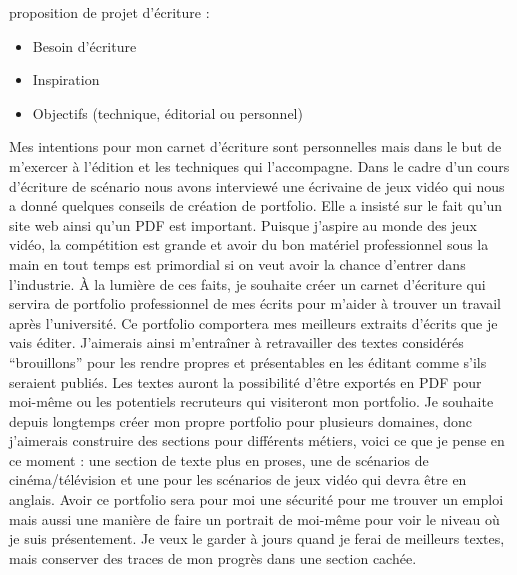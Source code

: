 \documentclass[12pt,french,letterpaper]{article}
\providecommand{\tightlist}{%
  \setlength{\itemsep}{0pt}\setlength{\parskip}{0pt}}
\begin{document}
\normalsize{proposition de projet d'écriture :

\begin{itemize}
\tightlist
\item
  Besoin d'écriture
\item
  Inspiration
\item
  Objectifs (technique, éditorial ou personnel)
\end{itemize}

Mes intentions pour mon carnet d'écriture sont personnelles mais dans le
but de m'exercer à l'édition et les techniques qui l'accompagne. Dans le
cadre d'un cours d'écriture de scénario nous avons interviewé une
écrivaine de jeux vidéo qui nous a donné quelques conseils de création
de portfolio. Elle a insisté sur le fait qu'un site web ainsi qu'un PDF
est important. Puisque j'aspire au monde des jeux vidéo, la compétition
est grande et avoir du bon matériel professionnel sous la main en tout
temps est primordial si on veut avoir la chance d'entrer dans
l'industrie. À la lumière de ces faits, je souhaite créer un carnet
d'écriture qui servira de portfolio professionnel de mes écrits pour
m'aider à trouver un travail après l'université. Ce portfolio comportera
mes meilleurs extraits d'écrits que je vais éditer. J'aimerais ainsi
m'entraîner à retravailler des textes considérés ``brouillons'' pour les
rendre propres et présentables en les éditant comme s'ils seraient
publiés. Les textes auront la possibilité d'être exportés en PDF pour
moi-même ou les potentiels recruteurs qui visiteront mon portfolio. Je
souhaite depuis longtemps créer mon propre portfolio pour plusieurs
domaines, donc j'aimerais construire des sections pour différents
métiers, voici ce que je pense en ce moment : une section de texte plus
en proses, une de scénarios de cinéma/télévision et une pour les
scénarios de jeux vidéo qui devra être en anglais. Avoir ce portfolio
sera pour moi une sécurité pour me trouver un emploi mais aussi une
manière de faire un portrait de moi-même pour voir le niveau où je suis
présentement. Je veux le garder à jours quand je ferai de meilleurs
textes, mais conserver des traces de mon progrès dans une section
cachée.}
\end{document}

